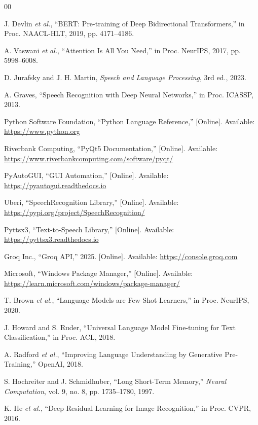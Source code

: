 \documentclass[conference]{IEEEtran}
\begin{document}
\footnotesize
\begin{thebibliography}{00}
\setlength{\itemsep}{5pt}

 J. Devlin \textit{et al.}, 
“BERT: Pre-training of Deep Bidirectional Transformers,” 
in Proc. NAACL-HLT, 2019, pp. 4171--4186.

 A. Vaswani \textit{et al.}, 
“Attention Is All You Need,” 
in Proc. NeurIPS, 2017, pp. 5998--6008.

 D. Jurafsky and J. H. Martin, 
\textit{Speech and Language Processing}, 3rd ed., 2023.

 A. Graves, 
“Speech Recognition with Deep Neural Networks,” 
in Proc. ICASSP, 2013.

 Python Software Foundation, 
“Python Language Reference,” [Online]. Available: \url{https://www.python.org}

 Riverbank Computing, 
“PyQt5 Documentation,” [Online]. Available: \url{https://www.riverbankcomputing.com/software/pyqt/}

 PyAutoGUI, 
“GUI Automation,” [Online]. Available: \url{https://pyautogui.readthedocs.io}

 Uberi, 
“SpeechRecognition Library,” [Online]. Available: \url{https://pypi.org/project/SpeechRecognition/}

 Pyttsx3, 
“Text-to-Speech Library,” [Online]. Available: \url{https://pyttsx3.readthedocs.io}

 Groq Inc., 
“Groq API,” 2025. [Online]. Available: \url{https://console.groq.com}

 Microsoft, 
“Windows Package Manager,” [Online]. Available: \url{https://learn.microsoft.com/windows/package-manager/}

 T. Brown \textit{et al.}, 
“Language Models are Few-Shot Learners,” 
in Proc. NeurIPS, 2020.

 J. Howard and S. Ruder, 
“Universal Language Model Fine-tuning for Text Classification,” 
in Proc. ACL, 2018.

 A. Radford \textit{et al.}, 
“Improving Language Understanding by Generative Pre-Training,” 
OpenAI, 2018.

 S. Hochreiter and J. Schmidhuber, 
“Long Short-Term Memory,” 
\textit{Neural Computation}, vol. 9, no. 8, pp. 1735--1780, 1997.

 K. He \textit{et al.}, 
“Deep Residual Learning for Image Recognition,” 
in Proc. CVPR, 2016.

\end{thebibliography}
\end{document}

